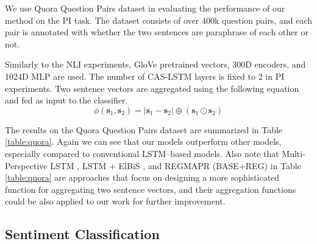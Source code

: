 \documentclass[wcp]{jmlr}
\begin{document}
    We use Quora Question Pairs dataset \citep{wang2017bilateral} in evaluating the performance of our method on the PI task.
    The dataset consists of over 400k question pairs, and each pair is annotated with whether the two sentences are paraphrase of each other or not.
    
    Similarly to the NLI experiments, GloVe pretrained vectors, 300D encoders, and 1024D MLP are used.
    The number of CAS-LSTM layers is fixed to 2 in PI experiments.
    Two sentence vectors are aggregated using the following equation and fed as input to the classifier.
    \begin{equation}
    \label{eq:pi-matching}
    \phi(\mathbf{s}_1, \mathbf{s}_2) = |\mathbf{s}_1 - \mathbf{s}_2| \oplus (\mathbf{s}_1 \odot \mathbf{s}_2)
    \end{equation}
    
    The results on the Quora Question Pairs dataset are summarized in Table \ref{table:quora}.
    Again we can see that our models outperform other models, especially compared to conventional LSTM--based models.
    Also note that Multi-Perspective LSTM \citep{wang2017bilateral}, LSTM + ElBiS \citep{choi2018elbis}, and REGMAPR (BASE+REG) \citep{brahma2018regmapr} in Table \ref{table:quora} are approaches that focus on designing a more sophisticated function for aggregating two sentence vectors, and their aggregation functions could be also applied to our work for further improvement.
    
    \subsection{Sentiment Classification}
    
\end{document}
